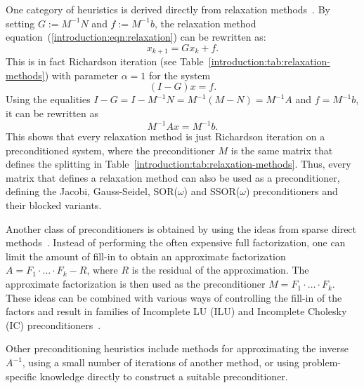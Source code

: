 One category of heuristics is derived directly from relaxation
methods~\cite{saad}. By setting $G := M^{-1}N$ and $f := M^{-1}b$, the
relaxation method equation~(\ref{introduction:eqn:relaxation}) can be rewritten
as:
\begin{equation}
    x_{k+1} = Gx_{k} + f.
\end{equation}
This is in fact Richardson iteration (see
Table~\ref{introduction:tab:relaxation-methods}) with parameter $\alpha = 1$ for
the system
\begin{equation}
    (I - G)x = f.
\end{equation}
Using the equalities $I - G = I - M^{-1}N = M^{-1}(M - N) = M^{-1}A$ and $f =
M^{-1}b$, it can be rewritten as
\begin{equation}
    M^{-1}Ax = M^{-1}b.
\end{equation}
This shows that every relaxation method is just Richardson iteration on a
preconditioned system, where the preconditioner $M$ is the same matrix that
defines the splitting in Table~\ref{introduction:tab:relaxation-methods}. Thus,
every matrix that defines a relaxation method can also be used as a
preconditioner, defining the Jacobi, Gauss-Seidel, SOR($\omega$) and
SSOR($\omega$) preconditioners and their blocked variants.

Another class of preconditioners is obtained by using the ideas from sparse
direct methods~\cite{saad}. Instead of performing the often expensive full
factorization, one can limit the amount of fill-in to obtain an approximate
factorization $A = F_1 \cdot \ldots \cdot F_k - R$, where $R$ is the residual of
the approximation. The approximate factorization is then used as the
preconditioner $M = F_1 \cdot \ldots \cdot F_k$. These ideas can be combined
with various ways of controlling the fill-in of the factors and result in
families of Incomplete LU (ILU) and Incomplete Cholesky (IC)
preconditioners~\cite{saad, parilut}.

Other preconditioning heuristics include methods for approximating the inverse
$A^{-1}$, using a small number of iterations of another method, or using
problem-specific knowledge directly to construct a suitable preconditioner.
